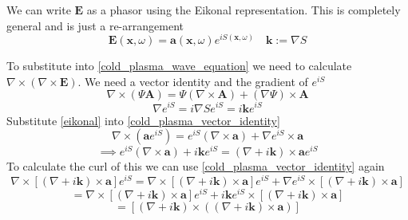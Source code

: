 We can write $\bm{E}$ as a phasor using the Eikonal representation. This is completely general and is just a re-arrangement
\begin{equation}\label{eikonal}
	\bm{E} \left( \bm{x}, \omega \right) = \bm{a} \left( \bm{x}, \omega \right) e^{iS \left( \bm{x}, \omega \right)} \quad \bm{k} := \nabla S
\end{equation}

To substitute into \eqref{cold_plasma_wave_equation} we need to calculate $\nabla \times \left( \nabla \times \bm{E} \right)$. We need a vector identity and the gradient of $e^{iS}$
\begin{equation} \label{cold_plasma_vector_identity}
	\nabla \times \left( \Psi \bm{A} \right) = \Psi \left( \nabla \times \bm{A} \right) + \left( \nabla \Psi \right) \times \bm{A}
\end{equation}
\begin{equation}
	\nabla e^{iS} = i \nabla S e^{iS} = i \bm{k} e^{iS}
\end{equation}
Substitute \eqref{eikonal} into \eqref{cold_plasma_vector_identity}
\begin{equation*}
	\nabla \times \left( \bm{a} e^{iS} \right) = e^{iS} \left( \nabla \times \bm{a} \right) + \nabla e^{iS} \times \bm{a}
\end{equation*}
\begin{equation}
	\implies e^{iS} \left( \nabla \times \bm{a} \right) + i \bm{k} e^{iS} = \left( \nabla + i \bm{k} \right) \times \bm{a} e^{iS}
\end{equation}
To calculate the curl of this we can use \eqref{cold_plasma_vector_identity} again
\begin{equation*}
	\nabla \times \left[ \left( \nabla + i \bm{k} \right) \times \bm{a} \right] e^{iS} = \nabla \times \left[ \left( \nabla + i \bm{k} \right) \times \bm{a} \right] e^{iS} + \nabla e^{iS} \times \left[ \left( \nabla + i \bm{k} \right) \times \bm{a} \right]
\end{equation*}
\begin{equation*}
	= \nabla \times \left[ \left( \nabla + i \bm{k} \right) \times \bm{a} \right] e^{iS} + i \bm{k} e^{iS} \times \left[ \left( \nabla + i \bm{k} \right) \times \bm{a} \right]
\end{equation*}
\begin{equation}
	= \left[ \left( \nabla + i \bm{k} \right) \times \left(\left( \nabla + i \bm{k} \right) \times \bm{a} \right)\right]
\end{equation}

